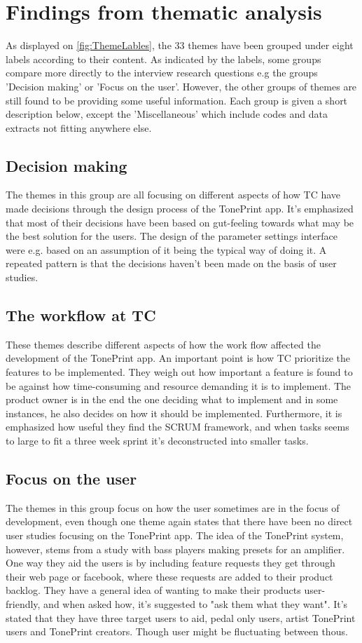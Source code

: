 \section{Findings from thematic analysis}
\label{ThematicFindings}
%
As displayed on \autoref{fig:ThemeLables}, the 33 themes have been grouped under eight labels according to their content. As indicated by the labels, some groups compare more directly to the interview research questions e.g the groups 'Decision making' or 'Focus on the user'. However, the other groups of themes are still found to be providing some useful information. Each group is given a short description below, except the 'Miscellaneous' which include codes and data extracts not fitting anywhere else.

\subsection*{Decision making}
The themes in this group are all focusing on different aspects of how TC have made decisions through the design process of the TonePrint app. It's emphasized that most of their decisions have been based on gut-feeling towards what may be the best solution for the users. The design of the parameter settings interface were e.g. based on an assumption of it being the typical way of doing it. A repeated pattern is that the decisions haven't been made on the basis of user studies. 

\subsection*{The workflow at TC}
These themes describe different aspects of how the work flow affected the development of the TonePrint app. An important point is how TC prioritize the features to be implemented. They weigh out how important a feature is found to be against how time-consuming and resource demanding it is to implement. The product owner is in the end the one deciding what to implement and in some instances, he also decides on how it should be implemented. Furthermore, it is emphasized how useful they find the SCRUM framework, and when tasks seems to large to fit a three week sprint it's deconstructed into smaller tasks.  

\subsection*{Focus on the user}
The themes in this group focus on how the user sometimes are in the focus of development, even though one theme again states that there have been no direct user studies focusing on the TonePrint app. The idea of the TonePrint system, however, stems from a study with bass players making presets for an amplifier. One way they aid the users is by including feature requests they get through their web page or facebook, where these requests are added to their product backlog. They have a general idea of wanting to make their products user-friendly, and when asked how, it's suggested to "ask them what they want". It's stated that they have three target users to aid, pedal only users, artist TonePrint users and TonePrint creators. Though user might be fluctuating between thous.

